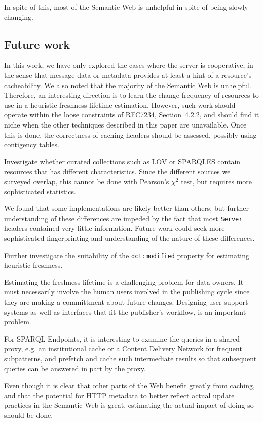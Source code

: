 \documentclass{llncs}
\newcommand{\rdfterm}[1]{\texttt{#1}}
\newcommand{\httph}[1]{\texttt{#1}}
\begin{document}
In spite of this, most of the Semantic Web is unhelpful in spite of
being slowly changing.

\subsection{Future work}

In this work, we have only explored the cases where the server is
cooperative, in the sense that message data or metadata provides at
least a hint of a resource's cacheability. We also noted that the
majority of the Semantic Web is unhelpful. Therefore, an interesting
direction is to learn the change frequency of resources to use in a
heuristic freshness lifetime estimation. However, such work should
operate within the loose constraints of RFC7234, Section~4.2.2, and
should find it niche when the other techniques described in this paper
are unavailable. Once this is done, the correctness of caching headers
should be assessed, possibly using contigency tables.

Investigate whether curated collections such as LOV or SPARQLES
contain resources that has different characteristics. Since the
different sources we surveyed overlap, this cannot be done with
Pearson's $\chi^2$ test, but requires more sophisticated statistics.

We found that some implementations are likely better than others, but
further understanding of these differences are impeded by the fact
that most \httph{Server} headers contained very little
information. Future work could seek more sophisticated fingerprinting
and understanding of the nature of these differences.

Further investigate the suitability of the \rdfterm{dct:modified}
property for estimating heuristic freshness.

Estimating the freshness lifetime is a challenging problem for data
owners. It must necessarily involve the human users involved in the
publishing cycle since they are making a committment about future
changes. Designing user support systems as well as interfaces that fit
the publisher's workflow, is an important problem.

For SPARQL Endpoints, it is interesting to examine the queries in a
shared proxy, e.g. an institutional cache or a Content
Delivery Network for frequent subpatterns, and prefetch and cache such
intermediate results so that subsequent queries can be answered in
part by the proxy.

Even though it is clear that other parts of the Web benefit greatly
from caching, and that the potential for HTTP metadata to better
reflect actual update practices in the Semantic Web is great,
estimating the actual impact of doing so should be done.
\end{document}
